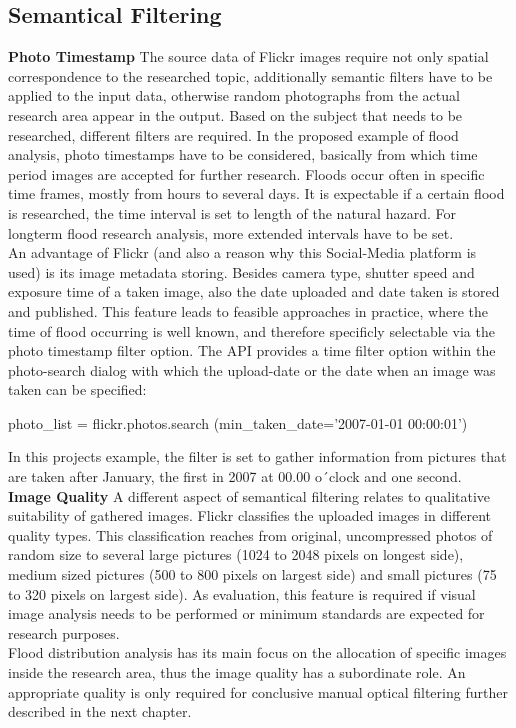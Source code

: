 \subsection{Semantical Filtering}
\textbf{Photo Timestamp}
The source data of Flickr images require not only spatial correspondence to the researched topic, additionally semantic filters have to be applied to the input data, otherwise random photographs from the actual research area appear in the output. Based on the subject that needs to be researched, different filters are required. In the proposed example of flood analysis, photo timestamps have to be considered, basically from which time period images are accepted for further research. Floods occur often in specific time frames, mostly from hours to several days. It is expectable if a certain flood is researched, the time interval is set to length of the natural hazard. For longterm flood research analysis, more extended intervals have to be set. \\
An advantage of Flickr (and also a reason why this Social-Media platform is used) is its image metadata storing. Besides camera type, shutter speed  and exposure time of a taken image, also the date uploaded and date taken is stored and published. This feature leads to feasible approaches in practice, where the time of flood occurring is well known, and therefore specificly selectable via the photo timestamp filter option. The API provides a time filter option within the photo-search dialog with which the upload-date or the date when an image was taken can be specified:
\begin{python}[linewidth=10cm]
photo_list = flickr.photos.search
(min_taken_date='2007-01-01 00:00:01')
\end{python}
In this projects example, the filter is set to gather information from pictures that are taken after January, the first in 2007 at 00.00 o´clock and one second.\\
\textbf{Image Quality}
A different aspect of semantical filtering relates to qualitative suitability of gathered images. Flickr classifies the uploaded images in different quality types. This classification reaches from original, uncompressed photos of random size to several large pictures (1024 to 2048 pixels on longest side), medium sized pictures (500 to 800 pixels on largest side) and small pictures (75 to 320 pixels on largest side). As evaluation, this feature is required if visual image analysis needs to be performed or minimum standards are expected for research purposes. \\
Flood distribution analysis has its main focus on the allocation of specific images inside the research area, thus the image quality has a subordinate role. An appropriate quality is only required for conclusive manual optical filtering further described in the next chapter.

